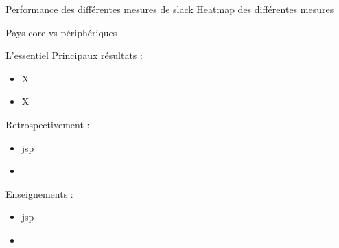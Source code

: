 \documentclass[9pt, xcolor={dvipsnames}]{beamer}
\begin{document}
\begin{frame}[label=slack]{Performance des différentes mesures de slack}
  Heatmap des différentes mesures
\end{frame}

\begin{frame}[label=results]{Pays core vs périphériques}
\end{frame}

\begin{frame}{L'essentiel}
  Principaux résultats :
  \begin{itemize}
    \item X
    \item X
  \end{itemize}
  \vspace{.2cm}
  Retrospectivement :
  \begin{itemize}
    \item jsp
    \item 
  \end{itemize}
  \vspace{.2cm}
  Enseignements :
  \begin{itemize}
    \item jsp
    \item 
  \end{itemize}
\end{frame}

\end{document}
